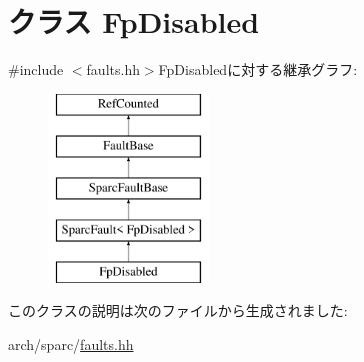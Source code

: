 \hypertarget{classSparcISA_1_1FpDisabled}{
\section{クラス FpDisabled}
\label{classSparcISA_1_1FpDisabled}
}


{\ttfamily \#include $<$faults.hh$>$}FpDisabledに対する継承グラフ:\begin{figure}[H]
\begin{center}
\leavevmode
\includegraphics[height=5cm]{classSparcISA_1_1FpDisabled}
\end{center}
\end{figure}


このクラスの説明は次のファイルから生成されました:\begin{DoxyCompactItemize}
\item 
arch/sparc/\hyperlink{arch_2sparc_2faults_8hh}{faults.hh}\end{DoxyCompactItemize}

